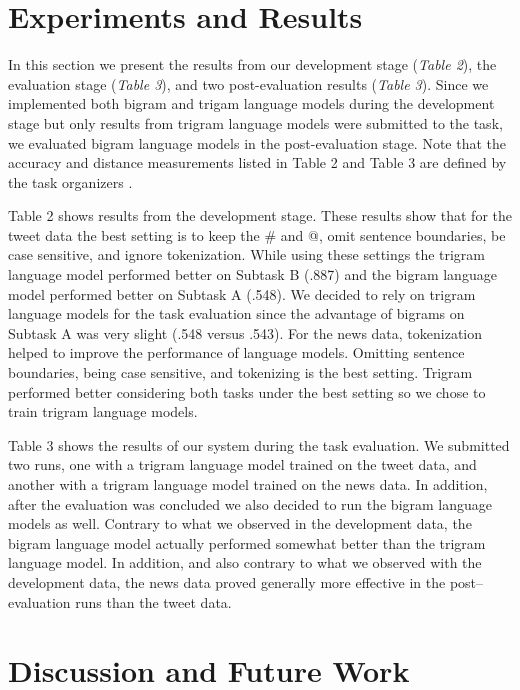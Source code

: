 \documentclass[11pt,a4paper]{article}
\begin{document}
\section{Experiments and Results}

In this section we present the results from our development stage (\textit{Table 2}), 
the evaluation stage (\textit{Table 3}), and two post-evaluation results 
(\textit{Table 3}). Since we implemented both bigram and trigam language models during the 
development stage but only results from trigram language models were submitted to the task, 
we evaluated bigram language models in the post-evaluation stage. Note that the accuracy and 
distance measurements listed in Table 2 and Table 3 are defined by the task organizers 
\cite{PotashRR17}. 

Table 2 shows results from the development stage. These results show 
that for the tweet data the best setting is to keep 
the \# and @, omit sentence boundaries, be case sensitive, and ignore 
tokenization. While using these settings the trigram language model
performed better on Subtask B (.887) and the bigram 
language model performed better on Subtask A (.548). We decided to rely
on trigram language models for the task evaluation since the advantage
of bigrams on Subtask A was very slight (.548 versus .543). 
For the news data, tokenization helped to improve the performance of 
language models. Omitting sentence boundaries, being case sensitive,  
and tokenizing is the best setting. 
Trigram performed better considering both 
tasks under the best setting so we chose to train trigram language  models.

Table 3 shows the results of our system during the task evaluation. We submitted
two runs, one with a trigram language model trained on the tweet data, and another
with a trigram language model trained on the news data. In addition, after
the evaluation was concluded we also decided to run the bigram language models as well.
Contrary to what we observed in the development data, the bigram language 
model actually performed somewhat better than the trigram
language model. In addition, and also contrary to what we observed with the
development data, the news data proved generally more effective in the
post--evaluation runs than the tweet data. 

\section{Discussion and Future Work}
\end{document}
